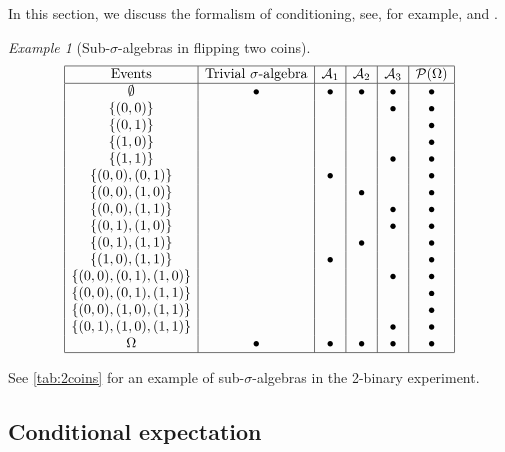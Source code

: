 \documentclass[12pt,a4paper]{amsart}
\theoremstyle{plain}%
\theoremstyle{definition}
\theoremstyle{remark}
\newtheorem{example}{Example}
\begin{document}
In this section, we discuss the formalism of conditioning, see, for example,
\cite[Ch.~3]{ross:2010introduction10} and \cite[IV.2]{malliavin:1995}.

\begin{example}[Sub-$\sigma$-algebras in flipping two coins]
  \begin{table}
    \[
\begin{array}{|c|c|c|c|c|c|}
\hline
\mbox{Events} & \mbox{Trivial $\sigma$-algebra} & \mathcal A_1 & \mathcal A_2 & \mathcal A_3
& \mathcal P(\Omega) \\
\hline
\emptyset & \bullet & \bullet & \bullet & \bullet & \bullet \\
\{(0,0)\} & & & & \bullet & \bullet \\
\{(0,1)\} & & & & & \bullet \\
\{(1,0)\} & & & & & \bullet \\
\{(1,1)\} & & & & \bullet & \bullet \\
\{(0,0),(0,1)\} & & \bullet & & & \bullet \\
\{(0,0),(1,0)\} & & & \bullet & & \bullet \\
\{(0,0),(1,1)\} & & & & \bullet & \bullet \\
\{(0,1),(1,0)\} & & & & \bullet & \bullet \\
\{(0,1),(1,1)\} & & & \bullet & & \bullet \\
\{(1,0),(1,1)\} & & \bullet & & & \bullet \\
\{(0,0),(0,1),(1,0)\} & & & & \bullet & \bullet \\
\{(0,0),(0,1),(1,1)\} & & & & & \bullet \\
\{(0,0),(1,0),(1,1)\} & & & & & \bullet \\
\{(0,1),(1,0),(1,1)\} & & & & \bullet & \bullet \\
\Omega & \bullet & \bullet & \bullet & \bullet & \bullet \\
 \hline
\end{array}\]
\caption{Levels of information in flipping two coins: no information,
  first coin only, second coin only, number of ones (indistinguishable
  coins), full information.\label{tab:2coins}}
\end{table}
See \cref{tab:2coins} for an example of sub-$\sigma$-algebras in the
2-binary experiment.
\end{example}

\subsection{Conditional expectation}
\end{document}
